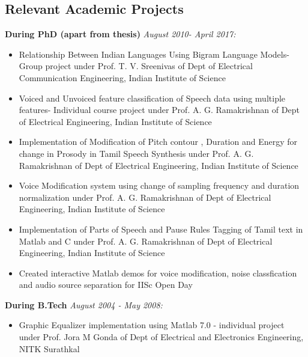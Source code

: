 \documentclass[line]{resume}
\begin{document}
{\begin{resume}
		\section{\mysidestyle Relevant Academic Projects}	
		\vspace{.1cm}
 \textbf{ During PhD (apart from thesis)} \textit{August 2010- April 2017:}
\begin{itemize}\itemsep=0.25em
	\item
	Relationship Between Indian Languages Using Bigram Language Models- Group
project under Prof. T. V. Sreenivas of Dept of Electrical Communication Engineering,
Indian Institute of Science

\item
Voiced and Unvoiced feature classification of Speech data using multiple features-
Individual course project under Prof. A. G. Ramakrishnan of Dept of Electrical
Engineering, Indian Institute of Science

\item
Implementation of Modification of Pitch contour , Duration and Energy   for change in Prosody in Tamil Speech Synthesis under Prof. A. G. Ramakrishnan of Dept of Electrical
Engineering, Indian Institute of Science
\item
Voice Modification system using change of sampling frequency and duration normalization under Prof. A. G. Ramakrishnan of Dept of Electrical
Engineering, Indian Institute of Science
\item
Implementation of Parts of Speech and Pause Rules Tagging of Tamil text in Matlab and C under Prof. A. G. Ramakrishnan of Dept of Electrical
Engineering, Indian Institute of Science
\item Created interactive Matlab demos for voice modification, noise classfication and audio source separation for IISc Open Day


	\end{itemize}

 \textbf{ During B.Tech} \textit{August 2004 - May 2008:}
 
\begin{itemize}\itemsep=0.25em


\item
Graphic Equalizer implementation using Matlab 7.0
- individual project under Prof. Jora M Gonda of Dept of
Electrical and Electronics Engineering, NITK Surathkal


\end{itemize}
\end{resume}}
\end{document}

